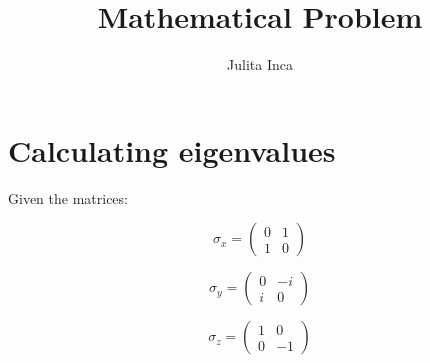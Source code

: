 \documentclass[]{article}
\title{Mathematical Problem}
\author{Julita Inca}
\begin{document}
\maketitle 

\section{ Calculating eigenvalues}

Given the matrices:

\begin{equation}
\sigma_x = 
\begin{pmatrix}
0 & 1 \\
1 & 0
\end{pmatrix}
\end{equation}

\begin{equation}
\sigma_y = 
\begin{pmatrix}
0 & -i \\
i & 0
\end{pmatrix}
\end{equation}

\begin{equation}
\sigma_z = 
\begin{pmatrix}
1 & 0 \\
0 & -1
\end{pmatrix}
\end{equation}
\end{document}

